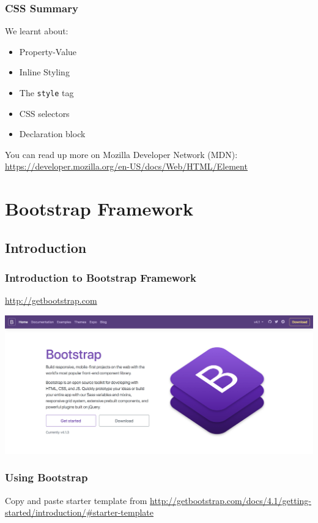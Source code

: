 \documentclass[12pt]{beamer}
\begin{document}
\begin{frame}
\frametitle{CSS Summary}
We learnt about:
\begin{itemize}
	\item Property-Value
	\item Inline Styling
	\item The \texttt{style} tag
	\item CSS selectors
	\item Declaration block
\end{itemize}
You can read up more on Mozilla Developer Network (MDN): \url{https://developer.mozilla.org/en-US/docs/Web/HTML/Element}
\end{frame}

\section{Bootstrap Framework}
\subsection{Introduction}
\begin{frame}
\frametitle{Introduction to Bootstrap Framework}
\begin{center}
	\url{http://getbootstrap.com}
	
	\includegraphics[width=\linewidth]{bootstrap}
\end{center}
\end{frame}

\begin{frame}
\frametitle{Using Bootstrap}
Copy and paste starter template from
\url{http://getbootstrap.com/docs/4.1/getting-started/introduction/\#starter-template}
\end{frame}
\end{document}
